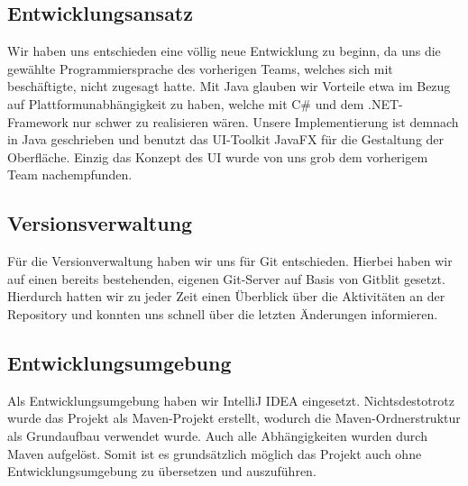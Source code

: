 \subsection{Entwicklungsansatz}
Wir haben uns entschieden eine völlig neue Entwicklung zu beginn, da uns die gewählte
Programmiersprache des vorherigen Teams, welches sich mit \textFlowDesign{} beschäftigte,
nicht zugesagt hatte. Mit Java glauben wir Vorteile etwa im Bezug auf 
Plattformunabhängigkeit zu haben, welche mit C\# und dem .NET-Framework nur schwer zu
realisieren wären. \newline
Unsere Implementierung ist demnach in Java geschrieben und benutzt das UI-Toolkit JavaFX
für die Gestaltung der Oberfläche. \newline
Einzig das Konzept des UI wurde von uns grob dem vorherigem Team nachempfunden.

\subsection{Versionsverwaltung}
Für die Versionverwaltung haben wir uns für Git entschieden. Hierbei haben wir auf einen
bereits bestehenden, eigenen Git-Server auf Basis von Gitblit gesetzt. Hierdurch hatten
wir zu jeder Zeit einen Überblick über die Aktivitäten an der Repository und konnten
uns schnell über die letzten Änderungen informieren.

\subsection{Entwicklungsumgebung}
Als Entwicklungsumgebung haben wir IntelliJ IDEA eingesetzt. Nichtsdestotrotz wurde das Projekt
als Maven-Projekt erstellt, wodurch die Maven-Ordnerstruktur als Grundaufbau verwendet wurde.
Auch alle Abhängigkeiten wurden durch Maven aufgelöst. Somit ist es grundsätzlich möglich das
Projekt auch ohne Entwicklungsumgebung zu übersetzen und auszuführen.